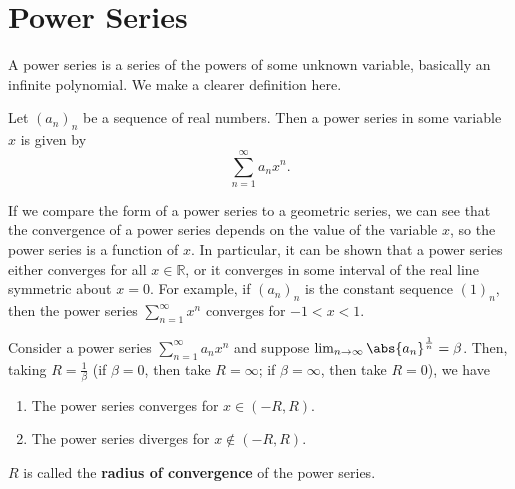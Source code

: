 \documentclass[../real_analysis.tex]{subfiles}
\begin{document}
    \section{Power Series}\label{sec:power-series}
        A power series is a series of the powers of some unknown variable, basically an infinite polynomial. We make a clearer definition here.
        \begin{definition}
            Let $(a_n)_n$ be a sequence of real numbers. Then a power series in some variable $x$ is given by
            \begin{equation}
                \sum_{n=1}^\infty a_nx^n.
            \end{equation}
        \end{definition}
        If we compare the form of a power series to a geometric series, we can see that the convergence of a power series depends on the value of the variable $x$, so the power series is a function of $x$. In particular, it can be shown that a power series either converges for all $x\in\mathbb{R}$, or it converges in some interval of the real line symmetric about $x=0$. For example, if $(a_n)_n$ is the constant sequence $(1)_n$, then the power series $\sum_{n=1}^\infty x^n$ converges for $-1<x<1$.
        \begin{theorem}
            Consider a power series $\sum_{n=1}^\infty a_nx^n$ and suppose $\lim_{n\to\infty}\abs{a_n}^\frac{1}{n}=\beta$. Then, taking $R=\frac{1}{\beta}$ (if $\beta=0$, then take $R=\infty$; if $\beta=\infty$, then take $R=0$), we have
            \begin{enumerate}[label={\upshape(\roman*)}]
                \item The power series converges for $x\in(-R, R)$.
                \item The power series diverges for $x\notin(-R, R)$.
            \end{enumerate}
            $R$ is called the \textbf{radius of convergence} of the power series.
        \end{theorem}
\end{document}
